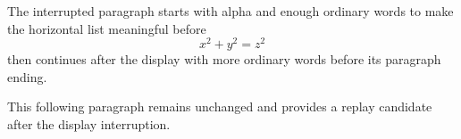 
\hsize=220pt \vsize=240pt
The interrupted paragraph starts with alpha and enough ordinary words to make the horizontal list meaningful before
$$x^2+y^2=z^2$$
then continues after the display with more ordinary words before its paragraph ending.

This following paragraph remains unchanged and provides a replay candidate after the display interruption.
\bye
